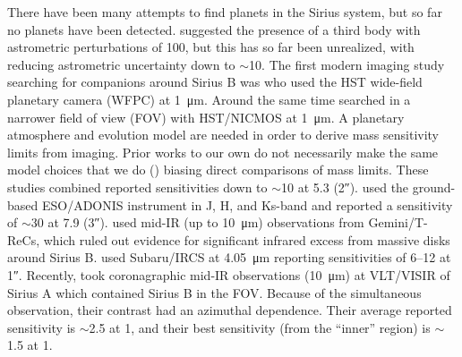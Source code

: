 \documentclass[twocolumn]{aastex631}
\begin{document}
There have been many attempts to find planets in the Sirius system, but so far no planets have been detected. \citet{benestSiriusTripleStar1995} suggested the presence of a third body with astrometric perturbations of \qty{100}{\milliarcsecond}, but this has so far been unrealized, with \citet{bondSiriusSystemIts2017} reducing astrometric uncertainty down to $\sim$\qty{10}{\milliarcsecond}. The first modern imaging study searching for companions around Sirius B was \citet{schroederSearchFaintCompanions2000} who used the HST wide-field planetary camera (WFPC) at \qty{1}{\micro\meter}. Around the same time \citet{kuchnerSearchExozodiacalDust2000} searched in a narrower field of view (FOV) with HST/NICMOS at \qty{1}{\micro\meter}. A planetary atmosphere and evolution model are needed in order to derive mass sensitivity limits from imaging. Prior works to our own do not necessarily make the same model choices that we do () biasing direct comparisons of mass limits. These studies combined reported sensitivities down to $\sim$\qty{10}{\jupitermass} at \qty{5.3}{\au} (\ang{;;2}).  \citet{bonnet-bidaudADONISHighContrast2008a} used the ground-based ESO/ADONIS instrument in J, H, and Ks-band and reported a sensitivity of $\sim$\qty{30}{\jupitermass} at \qty{7.9}{\au} (\ang{;;3}). \citet{skemerSiriusImagedMidinfrared2011} used mid-IR (up to \qty{10}{\micro\meter}) observations from Gemini/T-ReCs, which ruled out evidence for significant infrared excess from massive disks around Sirius B. \citet{thalmannPiercingGlareDirect2011} used Subaru/IRCS at \qty{4.05}{\micro\meter} reporting sensitivities of \qtyrange{6}{12}{\jupitermass} at \ang{;;1}. Recently, \citet{pathakHighContrastImaging2021} took coronagraphic mid-IR observations (\qty{10}{\micro\meter}) at VLT/VISIR of Sirius A which contained Sirius B in the FOV. Because of the simultaneous observation, their contrast had an azimuthal dependence. Their average reported sensitivity is $\sim$\qty{2.5}{\jupitermass} at \qty{1}{\au}, and their best sensitivity (from the ``inner'' region) is $\sim$\qty{1.5}{\jupitermass} at \qty{1}{\au}. 
\end{document}
